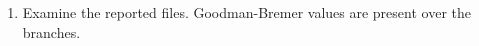 \documentclass[11pt]{article}
\begin{document}
\begin{enumerate}
\item Examine the reported files. Goodman-Bremer values are present
over the branches.
%          
%          
%
%          
\end{enumerate}
\end{document}
